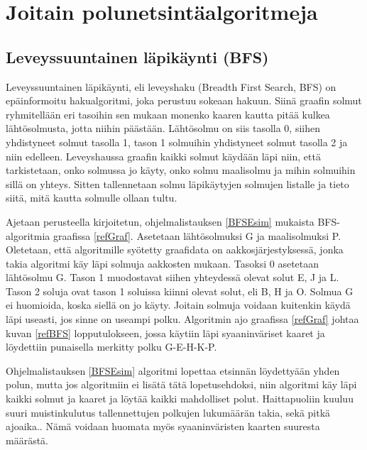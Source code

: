 \chapter{Joitain polunetsintäalgoritmeja}\label{joitainP}

\section{Leveyssuuntainen läpikäynti (BFS)}\label{bfs}
Leveyssuuntainen läpikäynti, eli leveyshaku (Breadth First Search, BFS) on 
epäinformoitu hakualgoritmi, joka perustuu sokeaan 
hakuun.\cite{applSciLawande} Siinä graafin solmut ryhmitellään eri tasoihin 
sen mukaan monenko kaaren kautta pitää kulkea lähtösolmusta, jotta niihin 
päästään. Lähtösolmu on siis tasolla 0, siihen yhdistyneet solmut tasolla 1, 
tason 1 solmuihin yhdistyneet solmut tasolla 2 ja niin edelleen. 
Leveyshaussa graafin kaikki solmut käydään läpi niin, että tarkistetaan, 
onko solmussa jo käyty, onko solmu maalisolmu ja mihin solmuihin sillä on 
yhteys. Sitten tallennetaan solmu läpikäytyjen solmujen listalle ja tieto 
siitä, mitä kautta solmulle ollaan tultu.\cite{BFSRahim} \par
	Ajetaan \textcite{applSciLawande} perusteella 
kirjoitetun, ohjelmalistauksen \ref{BFSEsim} mukaista BFS-algoritmia graafissa 
\ref{refGraf}. Asetetaan lähtösolmuksi G ja maalisolmuksi P. Oletetaan, että 
algoritmille syötetty graafidata on aakkosjärjestyksessä, jonka takia 
algoritmi käy läpi solmuja aakkosten mukaan. Tasoksi 0 asetetaan lähtösolmu G. 
Tason 1 muodostavat siihen yhteydessä olevat solut E, J ja L. Tason 2 soluja 
ovat tason 1 soluissa kiinni olevat solut, eli B, H ja O. Solmua G ei 
huomioida, koska siellä on jo käyty. Joitain solmuja voidaan kuitenkin käydä 
läpi useasti, jos sinne on useampi polku. Algoritmin ajo graafissa 
\ref{refGraf} johtaa kuvan \ref{refBFS} lopputulokseen, jossa käytiin läpi 
syaaninväriset kaaret ja löydettiin punaisella merkitty polku G-E-H-K-P. \par
	Ohjelmalistauksen \ref{BFSEsim} algoritmi lopettaa etsinnän 
löydettyään yhden polun, mutta jos algoritmiin ei lisätä tätä lopetusehdoksi, 
niin algoritmi käy läpi kaikki solmut ja kaaret ja löytää kaikki mahdolliset 
polut.\cite{BFSRahim} Haittapuoliin kuuluu suuri muistinkulutus tallennettujen 
polkujen lukumäärän takia,\cite{BFSRahim} sekä pitkä 
ajoaika.\cite{mazeGameTrilogi}. Nämä voidaan huomata myös syaaninväristen 
kaarten suuresta määrästä.

